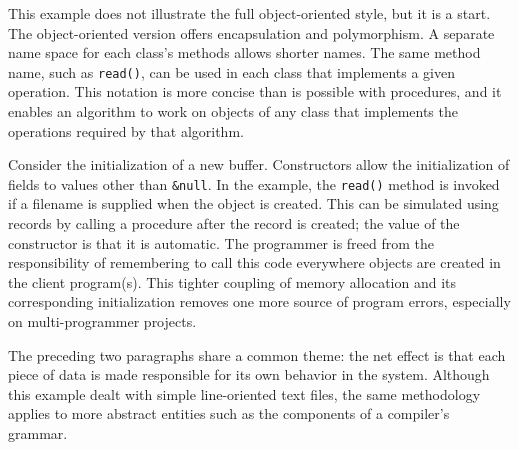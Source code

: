 
This example does not illustrate the full object-oriented style, but it
is a start. The object-oriented version offers encapsulation and
polymorphism. A separate name space for each class's
methods allows shorter names. The same method name, such as
\texttt{read()}, can be used in each class that
implements a given operation. This notation is more concise than is
possible with procedures, and it enables an algorithm to
work on objects of any class that implements the operations required by
that algorithm. 

Consider the initialization of a new buffer. Constructors allow the
initialization of fields to values other than \texttt{\&null}. In the
example, the \texttt{read()} method is invoked if a filename is
supplied when the object is created. This can be simulated using
records by calling a procedure after the record is created; the value
of the constructor is that it is automatic.
The programmer is freed from the responsibility of remembering to call
this code everywhere objects are created in the client program(s). This
tighter coupling of memory allocation and its
corresponding initialization removes one more source of program errors,
especially on multi-programmer projects. 

The preceding two paragraphs share a common theme:
the net effect is that each piece of data is made responsible for its
own behavior in the system. Although this example dealt with simple
line-oriented text files, the same methodology applies to more abstract
entities such as the components of a
compiler's grammar.

